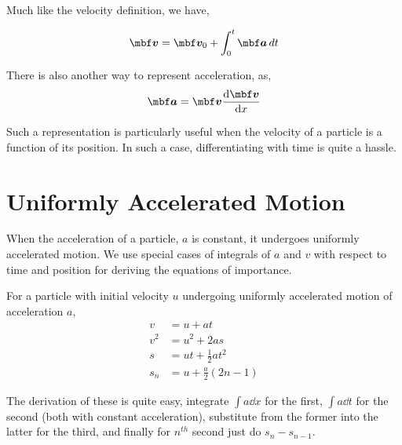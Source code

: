 Much like the velocity definition, we have,

\begin{equation}
    \vv = \vv_0 + \int_0^t \vec{a} \dd{t}
\end{equation}

There is also another way to represent acceleration, as, \[
    \vec{a} = \vec{v}\dv{\vec{v}}{x}
\]

Such a representation is particularly useful when the velocity of a particle 
is a function of its position. In such a case, differentiating with time is quite a hassle.

\section{Uniformly Accelerated Motion}

When the acceleration of a particle, \(a\) is constant, it undergoes uniformly accelerated motion.
We use special cases of integrals of \(a\) and \(v\) with respect to time and position for deriving
the equations of importance.

\begin{theorem}
    For a particle with initial velocity \(u\) undergoing uniformly accelerated motion of acceleration \(a\),
    \begin{align}
        v &= u + at \\
        v^2 &= u^2 + 2as \\
        s &= ut + \frac{1}{2} at^2 \\
        s_{n} &= u + \frac{a}{2}(2n - 1)
    \end{align}
\end{theorem}

The derivation of these is quite easy, integrate \(\int a \dd{x}\) for the first, 
\(\int a \dd{t}\) for the second (both with constant acceleration), substitute from the former into the latter for the third,
and finally for \(n^{th}\) second just do \(s_n - s_{n-1}\). 

